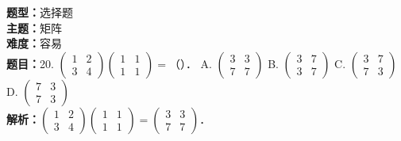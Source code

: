 \documentclass{ctexart}
\newenvironment{question}[5]{%
	\noindent\textbf{题型：}#1\\
	\textbf{主题：}#2\\
	\textbf{难度：}#3\\
	\textbf{题目：}#4\\
	\textbf{解析：}#5\\
	\vspace{1em}
}{}
\begin{document}
	\begin{question}
		{选择题}
		{矩阵}
		{容易}
		{20. \(\left(\begin{array}{ll}1 & 2 \\ 3 & 4\end{array}\right)\left(\begin{array}{ll}1 & 1 \\ 1 & 1\end{array}\right)=\)（）．
			A. \(\left(\begin{array}{ll}3 & 3 \\ 7 & 7\end{array}\right)\)
			B. \(\left(\begin{array}{ll}3 & 7 \\ 3 & 7\end{array}\right)\)
			C. \(\left(\begin{array}{ll}3 & 7 \\ 7 & 3\end{array}\right)\)
			D. \(\left(\begin{array}{ll}7 & 3 \\ 7 & 3\end{array}\right)\)}
		{\(\left(\begin{array}{ll}1 & 2 \\ 3 & 4\end{array}\right)\left(\begin{array}{ll}1 & 1 \\ 1 & 1\end{array}\right)=\left(\begin{array}{ll}3 & 3 \\ 7 & 7\end{array}\right)\)．}
	\end{question}
	
\end{document}
